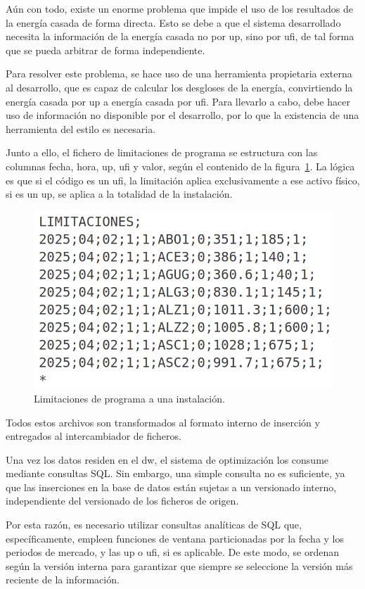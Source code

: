 Aún con todo, existe un enorme problema que impide el uso de los resultados de la energía casada de forma directa. Esto se debe a que el sistema desarrollado necesita la información de la energía casada no por \gls{up}, sino por \gls{ufi}, de tal forma que se pueda arbitrar de forma independiente.

Para resolver este problema, se hace uso de una herramienta propietaria externa al desarrollo, que es capaz de calcular los desgloses de la energía, convirtiendo la energía casada por \gls{up} a energía casada por \gls{ufi}. Para llevarlo a cabo, debe hacer uso de información no disponible por el desarrollo, por lo que la existencia de una herramienta del estilo es necesaria.

Junto a ello, el fichero de limitaciones de programa se estructura con las columnas fecha, hora, \gls{up}, \gls{ufi} y valor, según el contenido de la figura~\ref{fig:contenido-limitaciones}. La lógica es que si el código es un \gls{ufi}, la limitación aplica exclusivamente a ese activo físico, si es un \gls{up}, se aplica a la totalidad de la instalación.

\begin{figure}
  \centering
  \includegraphics[width=0.5\linewidth]{figures/contenido-limitaciones.png}
  \caption[Limitaciones de programa a una instalación.]{Limitaciones de programa a una instalación.}
  \label{fig:contenido-limitaciones}
\end{figure}

Todos estos archivos son transformados al formato interno de inserción y entregados al intercambiador de ficheros.

Una vez los datos residen en el \gls{dw}, el sistema de optimización los consume mediante consultas SQL\@. Sin embargo, una simple consulta no es suficiente, ya que las inserciones en la base de datos están sujetas a un versionado interno, independiente del versionado de los ficheros de origen.

Por esta razón, es necesario utilizar consultas analíticas de SQL que, específicamente, empleen funciones de ventana particionadas por la fecha y los periodos de mercado, y las \gls{up} o \gls{ufi}, si es aplicable. De este modo, se ordenan según la versión interna para garantizar que siempre se seleccione la versión más reciente de la información.

